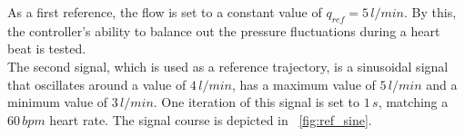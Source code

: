 As a first reference, the flow is set to a constant value of $q_{ref}=5\,l/min$. By this, the controller's ability to balance out the pressure fluctuations during a heart beat is tested.
\\The second signal, which is used as a reference trajectory, is a sinusoidal signal that oscillates around a value of $4\, l/min$, has a maximum value of $5\, l/min$ and a minimum value of $3\, l/min$. One iteration of this signal is set to $1\,s$, matching a $60\,bpm$ heart rate. The signal course is depicted in \figurename~\ref{fig:ref_sine}.

